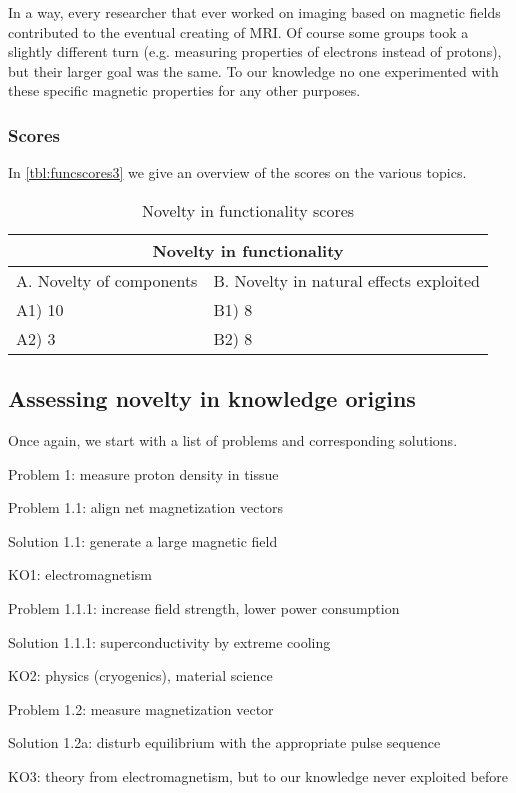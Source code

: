 In a way, every researcher that ever worked on imaging based on magnetic fields
contributed to the eventual creating of MRI. Of course some groups took a
slightly different turn (e.g. measuring properties of electrons instead of
protons), but their larger goal was the same. To our knowledge no one
experimented with these specific magnetic properties for any other purposes.

\subsubsection{Scores}
In \autoref{tbl:funcscores3} we give an overview of the scores on the various
topics.

\begin{table}[h]
\centering
\begin{tabular}{l l}
\hline
\multicolumn{2}{|c|}{Novelty in functionality} \\
\hline
A. Novelty of components & B. Novelty in natural effects exploited\\
A1) 10 & B1) 8\\ 
A2) 3 & B2) 8\\ 
\hline
\end{tabular}
\caption{Novelty in functionality scores}
\label{tbl:funcscores3}
\end{table}

\subsection{Assessing novelty in knowledge origins}
Once again, we start with a list of problems and corresponding solutions.

Problem 1: measure proton density in tissue

Problem 1.1: align net magnetization vectors

Solution 1.1: generate a large magnetic field

KO1: electromagnetism

Problem 1.1.1: increase field strength, lower power consumption

Solution 1.1.1: superconductivity by extreme cooling

KO2: physics (cryogenics), material science

Problem 1.2: measure magnetization vector

Solution 1.2a: disturb equilibrium with the appropriate pulse sequence

KO3: theory from electromagnetism, but to our knowledge never exploited before

